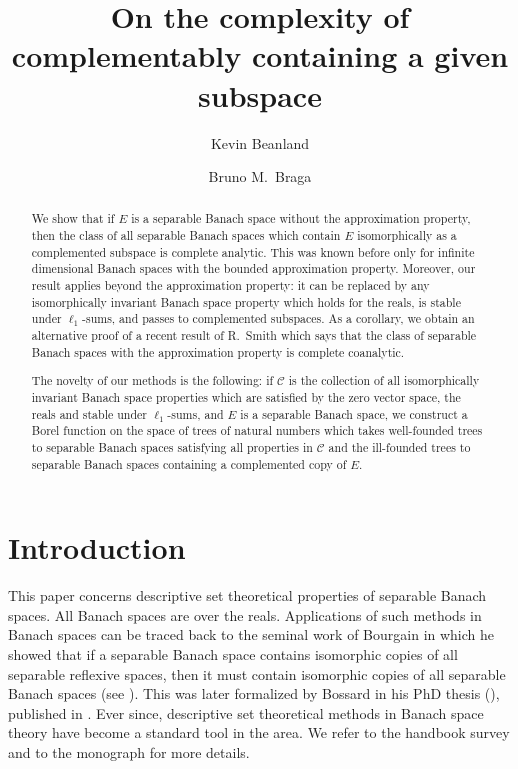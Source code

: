\documentclass[letterpaper]{amsart}
\title[Complexity of  complementably containing a given  subspace  ]{On the complexity of complementably  containing a given  subspace}
\author[K.\ Beanland]{Kevin Beanland}
\author[B.\ M.\ Braga]{Bruno M.\ Braga}
\numberwithin{equation}{section}
\theoremstyle{definition}
\begin{document}
\maketitle

\begin{abstract}
We show that if $E$ is a separable Banach space without the approximation property, then the class of all separable Banach spaces which contain $E$ isomorphically as a complemented subspace is complete analytic. This was known before only for infinite dimensional Banach spaces with the bounded approximation property. Moreover, our result applies beyond the approximation property: it can be replaced by  any isomorphically invariant Banach space property which holds for the reals, is stable under $\ell_1$-sums, and passes to complemented subspaces.  As a corollary, we obtain an alternative proof of a recent result of R.\ Smith which says that the class of separable Banach spaces with the approximation property is complete coanalytic. 

The novelty of our methods is the following: if  $\mathcal C$ is the collection of all isomorphically invariant  Banach space properties which are satisfied by the zero vector space, the reals and stable under $\ell_1$-sums, and  $E$ is a separable Banach space, we construct a Borel function on the space of trees of natural numbers which takes well-founded trees to separable  Banach spaces satisfying all properties in $\mathcal C$ and the ill-founded trees to separable Banach spaces containing a complemented copy of $E$. 
\end{abstract}


\section{Introduction}

 This paper concerns descriptive set theoretical properties of separable Banach spaces. All Banach spaces are over the reals. Applications of such methods in Banach spaces can be traced back to the seminal work of Bourgain in which he showed that if a separable Banach space contains isomorphic copies of all separable reflexive spaces, then it must contain isomorphic copies of all separable Banach spaces (see \cite[Theorem 10]{Bourgain1980PAMS}). This was later formalized by Bossard in his PhD thesis (\cite{BossardThesis}), published in \cite{Bossard2002Fund}. Ever since, descriptive set theoretical methods in Banach space theory have become a standard tool in the area. We refer to the handbook survey \cite{ArgyrosGodefroyRosenthal2003Hndbook} and to the monograph 
 \cite{Dodos2010LectureNotes} for more details. 
\end{document}
